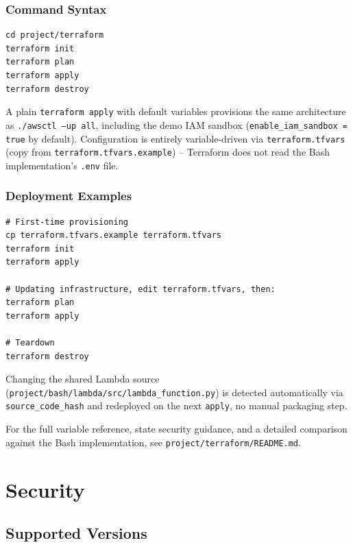 \documentclass[11pt,a4paper]{report}
\begin{document}
\subsection{Command Syntax}

\begin{lstlisting}
cd project/terraform
terraform init
terraform plan
terraform apply
terraform destroy
\end{lstlisting}

A plain \texttt{terraform apply} with default variables provisions the same
architecture as \texttt{./awsctl --up all}, including the demo IAM sandbox
(\texttt{enable\_iam\_sandbox = true} by default). Configuration is entirely
variable-driven via \texttt{terraform.tfvars} (copy from
\texttt{terraform.tfvars.example}) -- Terraform does not read the Bash
implementation's \texttt{.env} file.

\subsection{Deployment Examples}

\begin{lstlisting}
# First-time provisioning
cp terraform.tfvars.example terraform.tfvars
terraform init
terraform apply

# Updating infrastructure, edit terraform.tfvars, then:
terraform plan
terraform apply

# Teardown
terraform destroy
\end{lstlisting}

Changing the shared Lambda source
(\texttt{project/bash/lambda/src/lambda\_function.py}) is detected
automatically via \texttt{source\_code\_hash} and redeployed on the next
\texttt{apply}, no manual packaging step.

\begin{notebox}[Note]
For the full variable reference, state security guidance, and a detailed
comparison against the Bash implementation, see
\texttt{project/terraform/README.md}.
\end{notebox}

\chapter{Security}

\section{Supported Versions}
\end{document}
